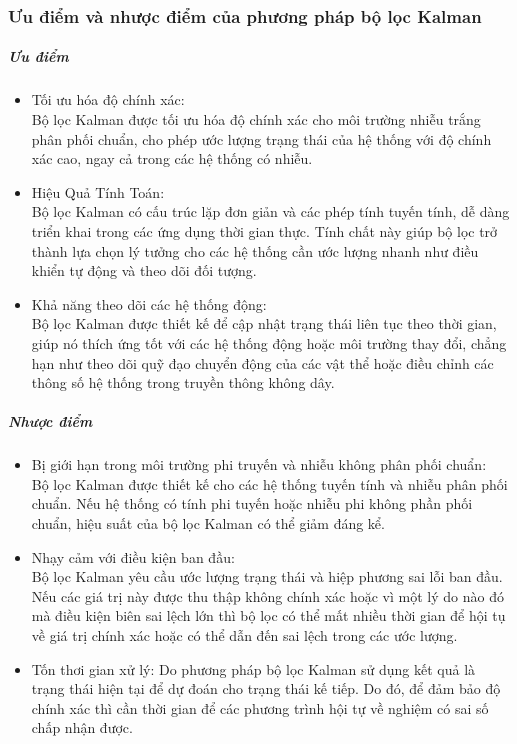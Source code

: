 \documentclass{article}
\begin{document}
\subsubsection{Ưu điểm và nhược điểm của phương pháp bộ lọc Kalman }
\subparagraph{Ưu điểm}
\begin{itemize}
\item  Tối ưu hóa độ chính xác:\\
Bộ lọc Kalman được tối ưu hóa độ chính xác cho môi trường nhiễu trắng phân phối chuẩn, cho phép ước lượng trạng thái của hệ thống với độ chính xác cao, ngay cả trong các hệ thống có nhiễu.

\item Hiệu Quả Tính Toán:\\
Bộ lọc Kalman có cấu trúc lặp đơn giản và các phép tính tuyến tính, dễ dàng triển khai trong các ứng dụng thời gian thực. Tính chất này giúp bộ lọc trở thành lựa chọn lý tưởng cho các hệ thống cần ước lượng nhanh như điều khiển tự động và theo dõi đối tượng.

\item Khả năng theo dõi các hệ thống động:\\
Bộ lọc Kalman được thiết kế để cập nhật trạng thái liên tục theo thời gian, giúp nó thích ứng tốt với các hệ thống động hoặc môi trường thay đổi, chẳng hạn như theo dõi quỹ đạo chuyển động của các vật thể hoặc điều chỉnh các thông số hệ thống trong truyền thông không dây.
\end{itemize}
\subparagraph{Nhược điểm}
\begin{itemize}
\item Bị giới hạn trong môi trường phi truyến và nhiễu không phân phối chuẩn:\\
Bộ lọc Kalman được thiết kế cho các hệ thống tuyến tính và nhiễu phân phối chuẩn. Nếu hệ thống có tính phi tuyến hoặc nhiễu phi không phần phối chuẩn, hiệu suất của bộ lọc Kalman có thể giảm đáng kể. 

\item Nhạy cảm với điều kiện ban đầu:\\
Bộ lọc Kalman yêu cầu ước lượng trạng thái và hiệp phương sai lỗi ban đầu. Nếu các giá trị này được thu thập không chính xác hoặc vì một lý do nào đó mà điều kiện biên sai lệch lớn thì bộ lọc có thể mất nhiều thời gian để hội tụ về giá trị chính xác hoặc có thể dẫn đến sai lệch trong các ước lượng.
\item Tốn thơi gian xử lý:
Do phương pháp bộ lọc Kalman sử dụng kết quả là trạng thái hiện tại để dự đoán cho trạng thái kế tiếp. Do đó, để đảm bảo độ chính xác thì cần thời gian để các phương trình hội tự về nghiệm có sai số chấp nhận được.
\end{itemize}
\end{document}
